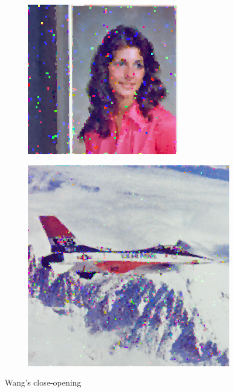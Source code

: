 \begin{subfigure}{0.9\textwidth}
\begin{subfigure}[t]{0.15\textwidth}
    \centering
  \end{subfigure}
\begin{subfigure}[t]{0.15\textwidth}
    \includegraphics[width=0.9\linewidth]{../images/outputs/denoise/hg/hg4.png}
    
    \centering
  \end{subfigure}
\begin{subfigure}[t]{0.15\textwidth}
    \includegraphics[width=0.9\linewidth]{../images/outputs/denoise/hg/hg5.png}
    
    \centering
  \end{subfigure}
 \caption{Wang's close-opening}
 \end{subfigure}
